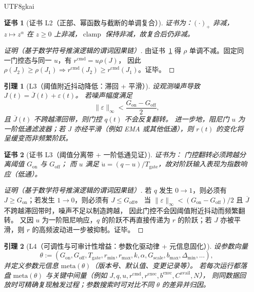 \documentclass[12pt]{article}
\newtheorem{lemma}{引理}[section]
\newtheorem{Certificate}{证书}[section]
\newcommand{\clamp}{\operatorname{clamp}}
\begin{document}
\begin{CJK*}{UTF8}{gkai}
\begin{Certificate}[证书 L2（正部、幂函数与截断的单调复合）]
\label{cert:tex28-ch5-l2}
证书为：$(\cdot)_{+}$ 非减，$z\mapsto z^{\alpha}$ 在 $z\ge 0$ 上非减，$\clamp$ 保持非减，故复合后仍非减。
\end{Certificate}

\begin{proof}[证明（基于数学符号推演逻辑的谓词因果链）]
由证书~\ref{cert:tex28-ch5-l2} 得 $\rho$ 单调不减。固定同一门控态与同一 $u$，有 $r^{\mathrm{cmd}}=u\rho(J)$，
因此 $\rho(J_2)\ge\rho(J_1)\Rightarrow r^{\mathrm{cmd}}(J_2)\ge r^{\mathrm{cmd}}(J_1)$。证毕。
\end{proof}

\begin{lemma}[L3（阈值附近抖动降低：滞回 + 平滑）]
\label{lem:tex28-ch5-l3}
设观测噪声导致 $J(t)=\overline{J}(t)+\varepsilon(t)$。
若噪声幅度满足
\[
  \|\varepsilon\|_{\infty}<\frac{G_{\mathrm{on}}-G_{\mathrm{off}}}{2},
\]
且 $\overline{J}(t)$ 不跨越滞回带，则门控 $q(t)$ 不会反复翻转。
进一步地，阻尼门 $u$ 为一阶低通滤波器；若 $J$ 亦经平滑（例如 EMA 或其他低通），则 $r(t)$ 的变化将呈缓变而非频繁阶跃。
\end{lemma}

\begin{Certificate}[证书 L3（阈值分离带 + 一阶低通见证）]
\label{cert:tex28-ch5-l3}
证书为：
门控翻转必须跨越分离阈值 $G_{\mathrm{on}}$ 与 $G_{\mathrm{off}}$；
而 $u$ 满足 $\dot u=(q-u)/T_{\mathrm{gate}}$，故对阶跃输入表现为指数响应（低通）。
\end{Certificate}

\begin{proof}[证明（基于数学符号推演逻辑的谓词因果链）]
若 $q$ 发生 $0\to 1$，则必须有 $J\ge G_{\mathrm{on}}$；若发生 $1\to 0$，则必须有 $J\le G_{\mathrm{off}}$。
当 $\|\varepsilon\|_{\infty}<(G_{\mathrm{on}}-G_{\mathrm{off}})/2$ 且 $\overline{J}$ 不跨越滞回带时，噪声不足以制造跨越，
因此门控不会因阈值附近抖动而频繁翻转。
又因 $u$ 为一阶阻尼响应，$q$ 的阶跃不再直接传递为 $r$ 的阶跃；若 $J$ 亦被平滑，则 $r$ 的高频波动进一步被抑制。证毕。
\end{proof}

\begin{lemma}[L4（可调性与可审计性增益：参数化驱动律 + 元信息固化）]
\label{lem:tex28-ch5-l4}
设参数向量
\[
  \theta :=(G_{\mathrm{on}},G_{\mathrm{off}},T_{\mathrm{gate}},r_{\min},r_{\max},k,\alpha,G_{\mathrm{scale}},b_{\max},
    \Delta_{\min},\dots),
\]
并定义参数元信息 $\mathrm{meta}(\theta)$（版本号、默认值、变更记录等）。
若每次运行都落盘 $\mathrm{meta}(\theta)$ 与关键中间量（例如 $J,q,u,r^{\mathrm{cmd}},r^{\mathrm{exec}},b^{\mathrm{exec}},C^{\mathrm{avail}}
  ,N$），
则同数据回放时可精确复现触发过程；参数搜索时可对比不同 $\theta$ 的差异并归因。
\end{lemma}


\end{CJK*}
\end{document}
